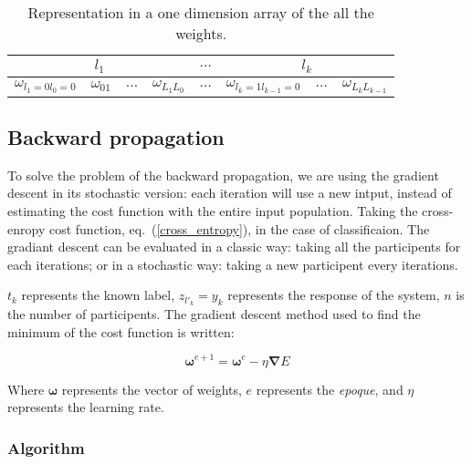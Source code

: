 \documentclass[final, paper=letter,5p,times,twocolumn]{elsarticle}
\begin{document}
\begin{table}[]
\centering
\caption{Representation in a one dimension array of the all the weights.}
\label{weights_in_mem}
\begin{tabular}{|c|c|c|c|c|c|c|c|}
\hline
\multicolumn{4}{|c|}{$l_{1}$} & $\hdots$ & \multicolumn{3}{c|}{$l_{k}$} \\ \hline
$\omega_{l_{1}=0l_{0}=0}$   &   $\omega_{01}$   & $\hdots$  &  $\omega_{L_{1}L_{0}}$   & $\hdots$ &    $\omega_{l_{k}=1l_{k-1}=0}$    & $\hdots$  &   $\omega_{L_{k}L_{k-1}}$ \\ \hline
\end{tabular}
\end{table}

\subsection{Backward propagation}

To solve the problem of the backward propagation, we are using the gradient descent in its stochastic version: each iteration will use a new intput, instead of estimating the cost function with the entire input population.
Taking the cross-enropy cost function, eq.~(\ref{cross_entropy}), in the case of classificaion. The gradiant descent can be evaluated in a classic way: taking all the participents for each iterations; or in a stochastic way: taking a new participent every iterations. 


$t_{k}$ represents the known label, $z_{l'_{k}} = y_{k}$ represents the response of the system, $n$ is the number of participents. The gradient descent method used to find the minimum of the cost function is written:

\begin{equation}
  \bm{\omega}^{e+1} = \bm{\omega}^{e} - \eta \bm{\nabla} E
  \label{gradient_descent}
\end{equation}

Where $\bm{\omega}$ represents the vector of weights, $e$ represents the {\it epoque}, and $\eta$ represents the learning rate. 


\subsubsection{Algorithm}
\end{document}

